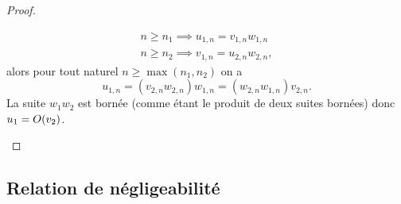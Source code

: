 \begin{proof}
\begin{enumerate}
\begin{align}
                n \geqslant n_1 \implies u_{1,n} = v_{1,n}w_{1,n} \\
            n \geqslant n_2 \implies v_{1,n} = u_{2,n}w_{2,n}, \end{align}
            alors pour tout naturel \(n \geqslant \max(n_1,n_2)\) on a
            \begin{equation}
                u_{1,n} = (v_{2,n} w_{2,n})w_{1,n} = (w_{2,n} w_{1,n}) v_{2,n}.
            \end{equation}
            La suite \(w_1 w_2\) est bornée (comme étant le produit de deux suites
            bornées) donc \(u_1 = O\mathopen{}\left(v_2\right)\).
    \end{enumerate}
\end{proof}

\subsection{Relation de négligeabilité}

